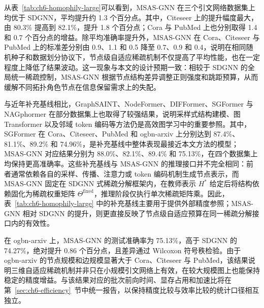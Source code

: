 从表~\ref{tab:ch6-homophily-large}可以看到，MSAS-GNN 在三个引文网络数据集上均优于 SDGNN，平均提升约 1.3 个百分点。其中，Citeseer 上的提升幅度最大，由 80.3\% 提高到 82.1\%，提升 1.8 个百分点；Cora 与 PubMed 上也分别取得 1.4 和 0.7 个百分点的增益。除平均准确率提升外，MSAS-GNN 在 Cora、Citeseer 与 PubMed 上的标准差分别由 0.9、1.1 和 0.5 降至 0.7、0.9 和 0.4，说明在相同随机种子和数据划分协议下，节点级自适应稀疏机制不仅提高了平均性能，也在一定程度上降低了结果波动。这一现象与本文的设计预期一致：相较于 SDGNN 的全局统一稀疏控制，MSAS-GNN 根据节点结构差异调整正则强度和跳距预算，从而缓解不同拓扑角色节点在信息保留需求上的失配。

与近年补充基线相比，GraphSAINT、NodeFormer、DIFFormer、SGFormer 与 NAGphormer 在部分数据集上也取得了较强结果，说明采样式结构建模、图 Transformer 以及邻域 token 编码等方法仍是高效图学习中的重要参照。其中，SGFormer 在 Cora、Citeseer、PubMed 和 ogbn-arxiv 上分别达到 87.4\%、81.1\%、89.2\% 和 74.96\%，是补充基线中整体表现最接近本文方法的模型；MSAS-GNN 对应结果分别为 88.0\%、82.1\%、89.4\% 和 75.13\%，在四个数据集上均保持更高准确率。这些补充基线与 MSAS-GNN 的推理接口并不完全相同：前者通常依赖各自的采样、传播、注意力或 token 编码机制生成节点表示，而 MSAS-GNN 固定在 SDGNN 式稀疏分解框架内，在教师表示 $H^*$ 给定后将结构依赖固化为稀疏权重矩阵 $\Theta^{\mathrm{fixed}}$，推理阶段仅执行单次稀疏矩阵乘。因此，表~\ref{tab:ch6-homophily-large} 中的补充基线主要用于提供外部精度参照；MSAS-GNN 相对 SDGNN 的提升，则更直接反映了节点级自适应预算在同一稀疏分解接口内的有效性。

在 ogbn-arxiv 上，MSAS-GNN 的测试准确率为 75.13\%，高于 SDGNN 的 74.27\%，绝对提升 0.86 个百分点，且差异通过 Wilcoxon 符号秩检验。由于 ogbn-arxiv 的节点规模和边规模显著大于 Cora、Citeseer 与 PubMed，该结果说明三维自适应稀疏机制并非只在小规模引文网络上有效，在较大规模图上也能保持稳定的精度增益。与该结果对应的批次前向时间、显存占用和加速比将在第~\ref{sec:ch6-efficiency}~节中统一报告，以保持精度比较与效率比较的统计口径相互独立。


